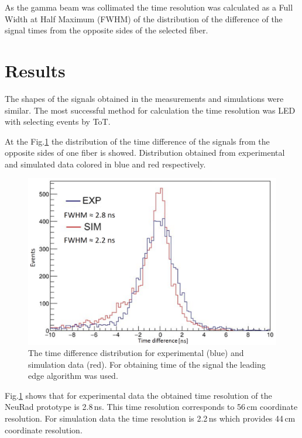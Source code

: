 \documentclass{webofc}
\begin{document}
\color{red}
As the gamma beam was collimated the time resolution was calculated as a Full Width at Half Maximum (FWHM) of the distribution of the difference of the signal times from the opposite sides of the selected fiber. 
\color{black}
\section{Results}

The shapes of the signals obtained in the measurements and simulations were similar. 
The most successful method for calculation the time resolution was LED with selecting events by ToT.

At the Fig.\ref{ris:tausim} the distribution of the time difference of the signals from the opposite sides of one fiber is showed. Distribution obtained from experimental and simulated data colored in blue and red respectively.

\begin{figure}[h]
	\centering
	\includegraphics[width=0.8\linewidth]{tausim.png}
	\caption{The time difference distribution for experimental (blue) and simulation data (red). For obtaining time of the signal the leading edge algorithm was used.}\label{ris:tausim}
\end{figure}

Fig.\ref{ris:tausim} shows that for experimental data the obtained time resolution of the NeuRad prototype is 2.8\,ns. This time resolution corresponds to 56\,cm coordinate resolution. For simulation data the time resolution is 2.2\,ns which provides 44\,cm coordinate resolution.  


\end{document}
